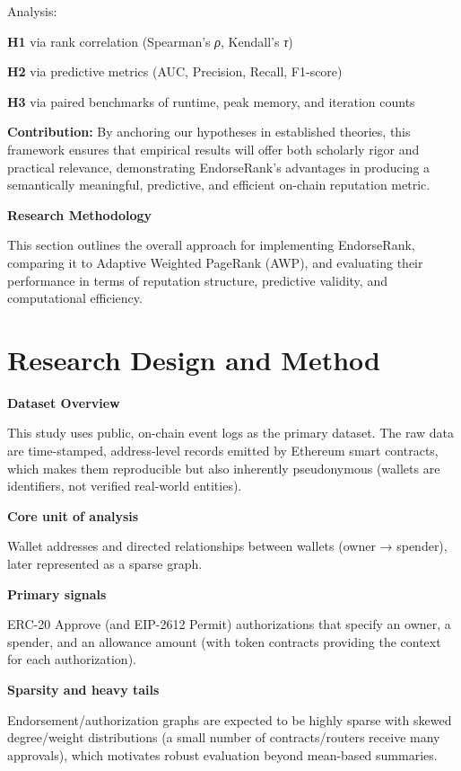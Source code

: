 \documentclass[
]{article}
\begin{document}
Analysis:

\textbf{H1} via rank correlation (Spearman's \emph{ρ}, Kendall's \emph{τ})

\textbf{H2} via predictive metrics (AUC, Precision, Recall, F1-score)

\textbf{H3} via paired benchmarks of runtime, peak memory, and iteration counts

\textbf{Contribution:} By anchoring our hypotheses in established theories, this framework ensures that empirical results will offer both scholarly rigor and practical relevance, demonstrating EndorseRank's advantages in producing a semantically meaningful, predictive, and efficient on-chain reputation metric.

\textbf{Research Methodology}

This section outlines the overall approach for implementing EndorseRank, comparing it to Adaptive Weighted PageRank (AWP), and evaluating their performance in terms of reputation structure, predictive validity, and computational efficiency.

\section{Research Design and Method}\label{research-design-and-method}

\textbf{Dataset Overview}

This study uses public, on-chain event logs as the primary dataset. The raw data are time-stamped, address-level records emitted by Ethereum smart contracts, which makes them reproducible but also inherently pseudonymous (wallets are identifiers, not verified real-world entities).

\textbf{Core unit of analysis}

Wallet addresses and directed relationships between wallets (owner → spender), later represented as a sparse graph.

\textbf{Primary signals}

ERC-20 Approve (and EIP-2612 Permit) authorizations that specify an owner, a spender, and an allowance amount (with token contracts providing the context for each authorization).

\textbf{Sparsity and heavy tails}

Endorsement/authorization graphs are expected to be highly sparse with skewed degree/weight distributions (a small number of contracts/routers receive many approvals), which motivates robust evaluation beyond mean-based summaries.
\end{document}
